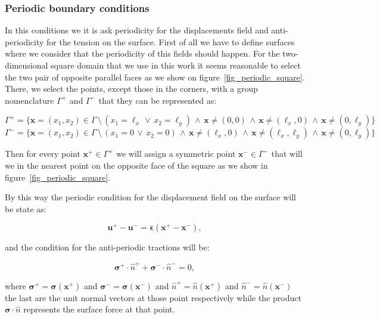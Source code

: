 \documentclass[review]{elsarticle}
\begin{document}
\subsubsection{Periodic boundary conditions}

In this conditions we it is ask periodicity for the displacements field and anti-periodicity for the tension on the
surface.
First of all we have to define surfaces where we consider that the periodicity of this fields should happen.
For the two-dimensional square domain that we use in this work it seems reasonable to select the two pair of opposite parallel faces 
as we show on figure~\ref{fig_periodic_square}.
There, we select the points, except those in the corners, with a group nomenclature $\Gamma^+$ and $\Gamma^-$ that they
can be represented as:

\begin{equation}
\Gamma^+ = \{ \bm{x} = (x_1, x_2) \in \Gamma \,\setminus\, (x_1 = \ell_x \,\vee\, x_2 = \ell_y) \,\wedge\,
\bm{x}\neq(0,0) \,\wedge\,  \bm{x}\neq(\ell_x,0) \,\wedge\, \bm{x}\neq(0,\ell_y) \}
\end{equation}
\begin{equation}
\Gamma^- = \{ \bm{x} = (x_1, x_2) \in \Gamma \,\setminus\, (x_1 = 0 \,\vee\, x_2 = 0) \,\wedge\,
  \bm{x}\neq(\ell_x,0) \,\wedge\, \bm{x}\neq(\ell_x,\ell_y) \,\wedge\, \bm{x}\neq(0,\ell_y) \}
\end{equation}

Then for every point $\bm{x}^+ \in \Gamma^+$ we will assign a symmetric point $\bm{x}^- \in \Gamma^-$ that will we in
the nearest point on the opposite face of the square as we show in figure~\ref{fig_periodic_square}.

By this way the periodic condition for the displacement field on the surface will be state as:

\begin{equation}
\bm{u}^+ - \bm{u}^- = \overline{\bm{\epsilon}} (\bm{x}^+ - \bm{x}^-),
\end{equation}

\noindent
and the condition for the anti-periodic tractions will be:

\begin{equation}
\bm{\sigma}^{+} \cdot\hat{n}^+ + \bm{\sigma}^{-} \cdot\hat{n}^- = 0,
\end{equation}

\noindent
where $\bm{\sigma}^{+} = \bm{\sigma}(\bm{x}^{+})$ and $\bm{\sigma}^{-} = \bm{\sigma}(\bm{x}^{-})$
and $\hat{n}^+ = \hat{n}(\bm{x}^{+})$ and $\hat{n}^- = \hat{n}(\bm{x}^{-})$ the last are the unit normal vectors 
at those point respectively while the product $\bm{\sigma}\cdot\hat{n}$ represents the surface force at that point.
\end{document}
